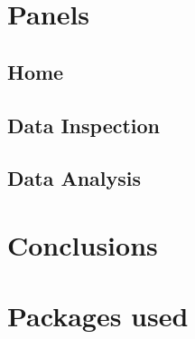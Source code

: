\documentclass[
12pt, %
a4paper, %
oneside, %
headinclude,footinclude, %
BCOR5mm, %
]{scrartcl}
\begin{document}

\section{Panels} \label{Panels}

\subsection{Home}

\subsection{Data Inspection}

\subsection{Data Analysis}

\section{Conclusions}

\section{Packages used}






\renewcommand{\refname}{\spacedlowsmallcaps{References}} %




\end{document}
